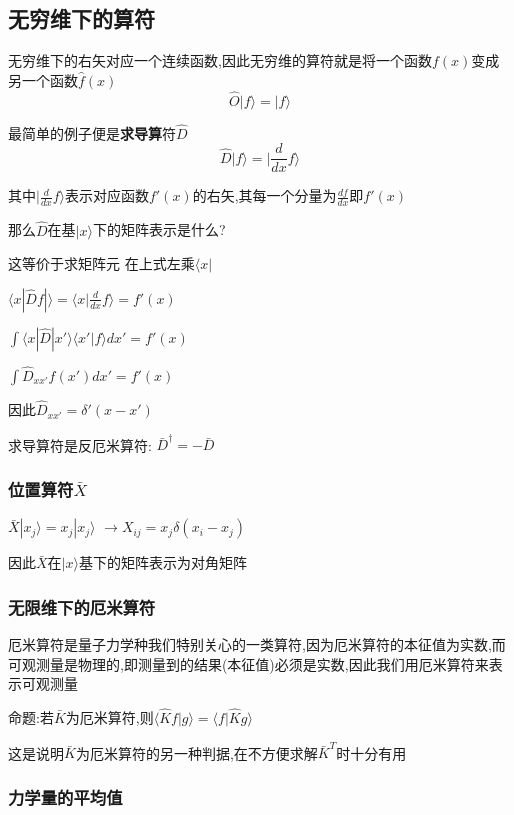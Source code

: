 \documentclass[lang=cn,15pt]{elegantbook}
\begin{document}
 \subsection{无穷维下的算符}
 无穷维下的右矢对应一个连续函数,因此无穷维的算符就是将一个函数$f(x)$变成另一个函数$\hat{f}(x)$
 \begin{equation*}
 	\hat{O}|f\rangle=|\hat{f}\rangle
 \end{equation*}
 
 最简单的例子便是\textbf{求导算}符$\hat{D}$
 \begin{equation*}
 		\hat{D}|f\rangle=|\frac{d}{dx}f\rangle
 \end{equation*}
 
 其中$|\frac{d}{dx}f\rangle$表示对应函数$f'(x)$的右矢,其每一个分量为$\frac{df}{dx}$即$f'(x)$
 
 那么$\hat{D}$在基$|x\rangle$下的矩阵表示是什么?
 
 这等价于求矩阵元
 在上式左乘$\langle x|$
 
 $\langle x|\hat{D}f|\rangle=\langle x|\frac{d}{dx}f\rangle=f'(x)$
 
 $\int{\langle x|\hat{D}|x'\rangle \langle x'|f\rangle dx' =f'(x)}$
 
 $\int{\hat{D}_{xx'}f\left( x' \right) dx'=f\prime(x)}$
 
 因此$\hat{D}_{xx'}=\delta'(x-x')$
 
 求导算符是反厄米算符: $\bar{D}^\dagger=-\bar{D}$
 
 \subsubsection{位置算符$\bar{X}$}
 $\bar{X}|x_j\rangle=x_j|x_j\rangle$
 $\rightarrow X_{ij}=x_j\delta(x_i-x_j)$
 
 因此$\bar{X}$在$|x\rangle$基下的矩阵表示为对角矩阵
 \subsubsection{无限维下的厄米算符}
 厄米算符是量子力学种我们特别关心的一类算符,因为厄米算符的本征值为实数,而可观测量是物理的,即测量到的结果(本征值)必须是实数,因此我们用厄米算符来表示可观测量
 
 命题:若$\bar{K}$为厄米算符,则$\langle \hat{K}f|g\rangle =\langle f|\hat{K}g\rangle  $
 
 这是说明$\bar{K}$为厄米算符的另一种判据,在不方便求解$\bar{K}^T$时十分有用
 \subsubsection{力学量的平均值}
 
\end{document}
